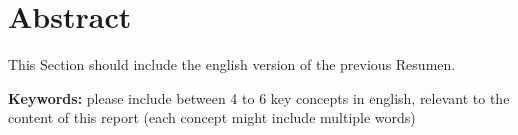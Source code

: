 \chapter{Abstract}

This Section should include the english version of the previous Resumen.

\vspace{0.5cm}

{\bf Keywords:} please include between 4 to 6 key concepts in english, relevant to the content of this report (each concept might include multiple words)